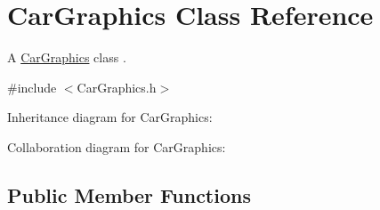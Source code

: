 \hypertarget{classCarGraphics}{}\section{Car\+Graphics Class Reference}
\label{classCarGraphics}


A \hyperlink{classCarGraphics}{Car\+Graphics} class .  




{\ttfamily \#include $<$Car\+Graphics.\+h$>$}



Inheritance diagram for Car\+Graphics\+:


Collaboration diagram for Car\+Graphics\+:
\subsection*{Public Member Functions}
